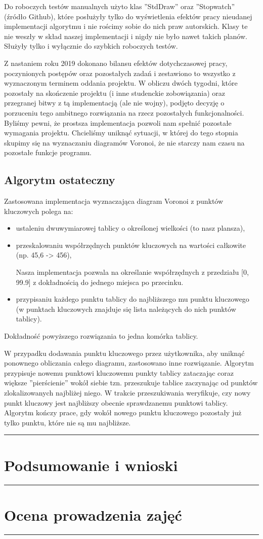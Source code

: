 \documentclass[a4paper,11pt]{article}
\newcommand{\linia}{\rule{\linewidth}{0.4mm}}
\begin{document}
Do roboczych testów manualnych użyto klas ''StdDraw'' oraz ''Stopwatch'' (źródło Github), które posłużyły tylko do wyświetlenia efektów pracy nieudanej implementacji algorytmu i nie rościmy sobie do nich praw autorskich. Klasy te nie weszły w skład naszej implementacji i nigdy nie było nawet takich planów. Służyły tylko i wyłącznie do szybkich roboczych testów.

Z nastaniem roku 2019 dokonano bilansu efektów dotychczasowej pracy, poczynionych postępów oraz pozostałych zadań i zestawiono to wszystko z wyznaczonym terminem oddania projektu. W obliczu dwóch tygodni, które pozostały na skończenie projektu (i inne studenckie zobowiązania) oraz przegranej bitwy z tą implementacją (ale nie wojny), podjęto decyzję o porzuceniu tego ambitnego rozwiązania na rzecz pozostałych funkcjonalności. Byliśmy pewni, że prostsza implementacja pozwoli nam spełnić pozostałe wymagania projektu. Chcieliśmy uniknąć sytuacji, w której do tego stopnia skupimy się na wyznaczaniu diagramów Voronoi, że nie starczy nam czasu na pozostałe funkcje programu.
\subsection{Algorytm ostateczny}
Zastosowana implementacja wyznaczająca diagram Voronoi z punktów kluczowych polega na:
\begin{itemize}
\item ustaleniu dwuwymiarowej tablicy o określonej wielkości (to nasz plansza),
\item przeskalowaniu współrzędnych punktów kluczowych na wartości całkowite (np. 45,6 -> 456),
		
		Nasza implementacja pozwala na określanie współrzędnych z przedziału [0, 99.9] z dokładnością do jednego miejsca po przecinku.
\item przypisaniu każdego punktu tablicy do najbliższego mu punktu kluczowego (w punktach kluczowych znajduje się lista należących do nich punktów tablicy).
\end{itemize}

Dokładność powyższego rozwiązania to jedna komórka tablicy.

W przypadku dodawania punktu kluczowego przez użytkownika, aby uniknąć ponownego obliczania całego diagramu, zastosowano inne rozwiązanie. Algorytm przypisuje nowemu punktowi kluczowemu punkty tablicy zataczając coraz większe ''pierścienie'' wokół siebie tzn. przeszukuje tablice zaczynając od punktów zlokalizowanych najbliżej niego. W trakcie przeszukiwania weryfikuje, czy nowy punkt kluczowy jest najbliższy obecnie sprawdzanemu punktowi tablicy. Algorytm kończy prace, gdy wokół nowego punktu kluczowego pozostały już tylko punktu, które nie są mu najbliższe.

\noindent\linia
\section{Podsumowanie i wnioski}

\noindent\linia
\section{Ocena prowadzenia zajęć}

\noindent\linia
\end{document}
